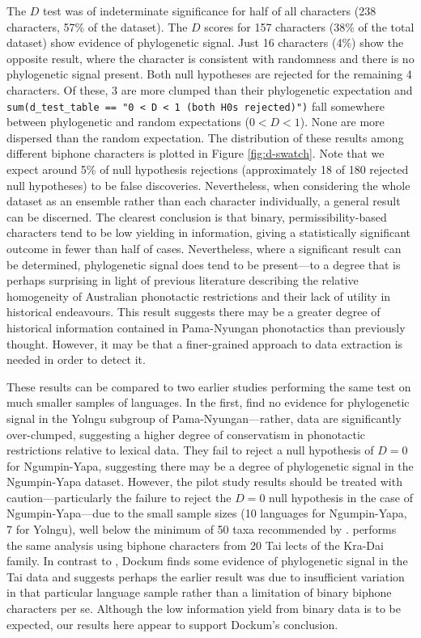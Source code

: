 The \(D\) test was of indeterminate significance for half of all characters (238 characters, 57\% of the dataset). The \(D\) scores for 157 characters (38\% of the total dataset) show evidence of phylogenetic signal. Just 16 characters (4\%) show the opposite result, where the character is consistent with randomness and there is no phylogenetic signal present. Both null hypotheses are rejected for the remaining 4 characters. Of these, 3 are more clumped than their phylogenetic expectation and \texttt{sum(d\_test\_table\ ==\ "0\ \textless{}\ D\ \textless{}\ 1\ (both\ H0s\ rejected)")} fall somewhere between phylogenetic and random expectations (\(0 < D < 1\)). None are more dispersed than the random expectation. The distribution of these results among different biphone characters is plotted in Figure \ref{fig:d-swatch}. Note that we expect around 5\% of null hypothesis rejections (approximately 18 of 180 rejected null hypotheses) to be false discoveries. Nevertheless, when considering the whole dataset as an ensemble rather than each character individually, a general result can be discerned. The clearest conclusion is that binary, permissibility-based characters tend to be low yielding in information, giving a statistically significant outcome in fewer than half of cases. Nevertheless, where a significant result can be determined, phylogenetic signal does tend to be present---to a degree that is perhaps surprising in light of previous literature describing the relative homogeneity of Australian phonotactic restrictions and their lack of utility in historical endeavours. This result suggests there may be a greater degree of historical information contained in Pama-Nyungan phonotactics than previously thought. However, it may be that a finer-grained approach to data extraction is needed in order to detect it.

These results can be compared to two earlier studies performing the same test on much smaller samples of languages. In the first, \textcite{macklin-cordes_high-definition_2015} find no evidence for phylogenetic signal in the Yolngu subgroup of Pama-Nyungan---rather, data are significantly over-clumped, suggesting a higher degree of conservatism in phonotactic restrictions relative to lexical data. They fail to reject a null hypothesis of \(D = 0\) for Ngumpin-Yapa, suggesting there may be a degree of phylogenetic signal in the Ngumpin-Yapa dataset. However, the pilot study results should be treated with caution---particularly the failure to reject the \(D = 0\) null hypothesis in the case of Ngumpin-Yapa---due to the small sample sizes (10 languages for Ngumpin-Yapa, 7 for Yolngu), well below the minimum of 50 taxa recommended by \textcite{fritz_selectivity_2010}. \textcite{dockum_phylogeny_2018} performs the same analysis using biphone characters from 20 Tai lects of the Kra-Dai family. In contrast to \textcite{macklin-cordes_high-definition_2015}, Dockum finds some evidence of phylogenetic signal in the Tai data and suggests perhaps the earlier result was due to insufficient variation in that particular language sample rather than a limitation of binary biphone characters per se. Although the low information yield from binary data is to be expected, our results here appear to support Dockum's conclusion.

